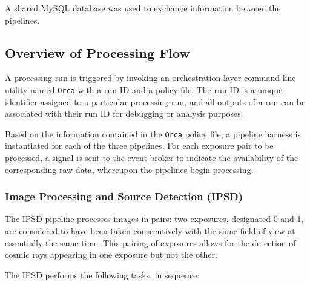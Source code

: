 A shared MySQL database was used to exchange information between the
pipelines.

\subsection{Overview of Processing Flow}

A processing run is triggered by invoking an orchestration layer 
command line utility named \texttt{Orca} with a run ID and a policy file.
The run ID is a unique identifier assigned to a particular processing run,
and all outputs of a run can be associated with their run ID for debugging
or analysis purposes.

Based on the information contained in the \texttt{Orca} policy file, a
pipeline harness is instantiated for each of the three pipelines. For each
exposure pair to be processed, a signal is sent to the event broker to indicate
the availability of the corresponding raw data, whereupon the pipelines 
begin processing.

\subsubsection{Image Processing and Source Detection (IPSD)}

The IPSD pipeline processes images in pairs: two exposures, designated 0 and 1, 
are considered to have been taken consecutively with the same field of view at 
essentially the same time. This pairing of exposures allows for the detection 
of cosmic rays appearing in one exposure but not the other. 

The IPSD performs the following tasks, in sequence:

